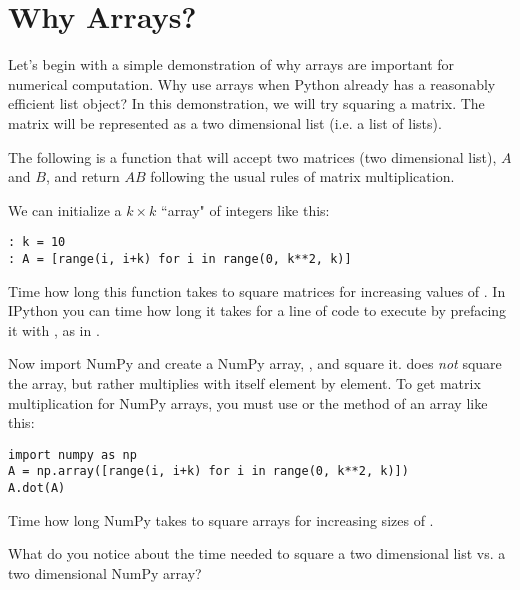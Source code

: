 \label{lab:Essentials_NumPy}

\section*{Why Arrays?}
Let's begin with a simple demonstration of why arrays are important for numerical computation.
Why use arrays when Python already has a reasonably efficient list object?
In this demonstration, we will try squaring a matrix.
The matrix will be represented as a two dimensional list (i.e. a list of lists).

The following is a function that will accept two matrices (two dimensional list), $A$ and $B$, and return $AB$ following the usual rules of matrix multiplication.

We can initialize a $k \times k$ ``array" of integers like this:
\begin{lstlisting}
: k = 10
: A = [range(i, i+k) for i in range(0, k**2, k)]
\end{lstlisting}

\begin{problem}
Time how long this function takes to square matrices for increasing values of .
In IPython you can time how long it takes for a line of code to execute by prefacing it with , as in .

Now import NumPy and create a NumPy array, , and square it.
 does \emph{not} square the array, but rather multiplies  with itself element by element.
To get matrix multiplication for NumPy arrays, you must use  or the  method of an array like this:
\begin{lstlisting}
import numpy as np
A = np.array([range(i, i+k) for i in range(0, k**2, k)])
A.dot(A)
\end{lstlisting}
Time how long NumPy takes to square arrays for increasing sizes of .

What do you notice about the time needed to square a two dimensional list vs. a two dimensional NumPy array?

\end{problem}


